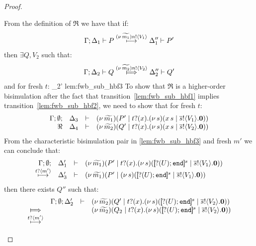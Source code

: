 \begin{proof}
\begin{enumerate}
\begin{itemize}
							\noi From the definition of $\Re$ we have that if:
							\begin{eqnarray}
								\Gamma; \Delta_1 \vdash P \stackrel{(\nu\, \widetilde{m_1}) n ! \langle V_1 \rangle}{\longmapsto} \Delta_1'' \vdash P'
								\label{lem:fwb_sub_hbf1}
							\end{eqnarray}
							then $\exists Q, V_2$ such that:
							\begin{eqnarray}
								\horel{\Gamma}{\Delta_2}{Q}{\Hby{\news{\widetilde{m_2}} \bactout{n}{V_2}}}{\Delta_2''}{Q'}
								\label{lem:fwb_sub_hbf2}
							\end{eqnarray}
							and for fresh $t$:
								{\hwb}
								{\Delta_2'}{}
								{lem:fwb_sub_hbf3}
							\noi 
							To show that $\Re$ is a higher-order bisimulation
							after the fact that transition~\eqref{lem:fwb_sub_hbf1} implies transition~\eqref{lem:fwb_sub_hbf2},
							we need to show that for fresh $t$:
							\begin{eqnarray}
								\begin{array}{rcll} \Gamma; \emptyset; &\Delta_3& \vdash& (\nu\, \widetilde{m_1})(P' \;|\; t ? (x) . (\nu\, s)(x\, {s} \;|\; \overline{s} ! \langle V_1 \rangle . \mathbf{0}))\\ \Re &\Delta_4& \vdash &  (\nu\, \widetilde{m_2})(Q' \;|\; t ? (x) . (\nu\, s)(x\, {s} \;|\; \overline{s} ! \langle V_2 \rangle . \mathbf{0})) \end{array}
								\label{lem:fwb_sub_hbf4}
							\end{eqnarray}
							\noi
							From the characteristic bisimulation pair in \eqref{lem:fwb_sub_hbf3}
							and fresh $m'$ we can conclude that:
							\[
								\mhorel{\Gamma}{\Delta_1'}{\newsp{\widetilde{m_1}}{P' \Par \fotrigger{t}{x}{s}{\btinp{U} \tinact}{V_1}}}
								{\hby{\bactinp{t}{m'}}}
								{\Delta_3'}{}{\newsp{\widetilde{m_1}}{P' \Par \newsp{s}{\map{\btinp{U} \tinact}^{s} \Par \bout{\dual{s}}{V_1} \inact}}}
							\]
							then there exists $Q''$ such that:
							\begin{eqnarray}
								\begin{array}{crll}
									& \Gamma; \es; \Delta_2' & \proves &		
									\newsp{\widetilde{m_2}}{Q' \Par \fotrigger{t}{x}{s}{\btinp{U} \tinact}{V_2}}
									\\
									\Hby{} &&&
									\newsp{\widetilde{m_2}}{Q_2 \Par \fotrigger{t}{x}{s}{\btinp{U} \tinact}{V_2}}
									\\
									{\hby{\bactinp{t}{m'}}}& & &

\end{array}
\end{eqnarray}
\end{itemize}
\end{enumerate}
\end{proof}
